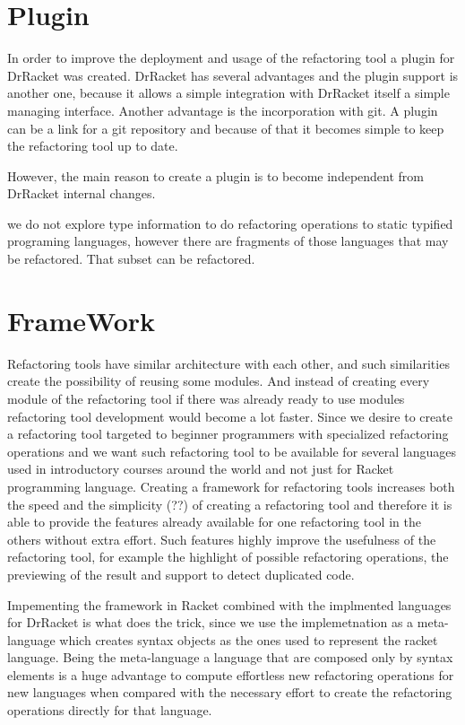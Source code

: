 
\section{Plugin}
In order to improve the deployment and usage of the refactoring tool a plugin
for DrRacket was created.
DrRacket has several advantages and the plugin support is another one, because
it allows a simple integration with DrRacket itself a simple managing interface.
Another advantage is the incorporation with git. A plugin can be a link for a git
repository and because of that it becomes simple to keep the refactoring tool up to date.

However, the main reason to create a plugin is to become independent from DrRacket
internal changes.

we do not explore type information to do refactoring operations to static typified
programing languages, however there are fragments of those languages that may be refactored.
That subset can be refactored. %
\section{FrameWork}
Refactoring tools have similar architecture with each other, and such similarities
create the possibility of reusing some modules. And instead of creating every
module of the refactoring tool if there was already ready to use modules refactoring
tool development would become a lot faster.
Since we desire to create a refactoring tool targeted to beginner programmers with
specialized refactoring operations and we want such refactoring tool to be available
for several languages used in introductory courses around the world and not just for
Racket programming language.
Creating a framework for refactoring tools increases both the speed and the simplicity (??)
of creating a refactoring tool and therefore it is able to provide the features already available
for one refactoring tool in the others without extra effort. Such features highly improve
the usefulness of the refactoring tool, for example the highlight of possible refactoring
operations, the previewing of the result and support to detect duplicated code.


 Impementing the framework in Racket combined with the implmented languages for DrRacket is what does the trick,
 since we use the implemetnation as a meta-language which creates syntax objects as the ones used to represent the racket language.
  Being the meta-language a language that are
 composed only by syntax elements is a huge advantage to compute effortless new
 refactoring operations for new languages when compared with the necessary effort to create
 the refactoring operations directly for that language.

